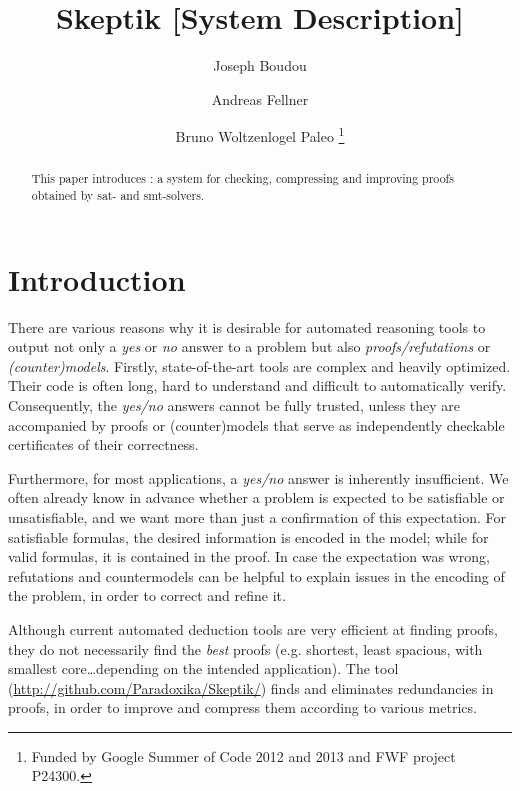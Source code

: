 \documentclass{llncs}
\title{ 
Skeptik [System Description]
}
\author{
  Joseph Boudou\inst{1}
  \and 
  Andreas Fellner\inst{2,3}
  \and 
  Bruno Woltzenlogel Paleo\inst{3}
  \thanks{Funded by Google Summer of Code 2012 and 2013 and FWF project P24300.}
}
\institute{
  IRIT, Universit\'e de Toulouse, France \\
  \email{joseph.boudou@irit.fr}
  \and 
  Free University of Bolzano, Italy \\
  \email{fellner.a@gmail.com}
  \and 
  Vienna University of Technology, Austria \\
  \email{bruno@logic.at}
}
\begin{document}
\maketitle


\begin{abstract}
This paper introduces \skeptik: a system for checking, compressing and improving proofs obtained by sat- and smt-solvers.
\end{abstract}

\setcounter{footnote}{0}


\section{Introduction}

There are various reasons why it is desirable 
for automated reasoning
tools to output not only a \emph{yes} or \emph{no} answer to a problem 
but also \emph{proofs/refutations} or \emph{(counter)models}. 
%
Firstly, state-of-the-art tools are complex and heavily optimized. Their code is often long, hard to understand and difficult to automatically verify. Consequently, the \emph{yes/no} answers cannot be fully trusted, unless they are accompanied by proofs or (counter)models that serve as independently checkable certificates of 
their correctness. 

Furthermore, for most applications, a \emph{yes/no} answer is inherently insufficient. We often already know in advance whether a problem is expected to be satisfiable or unsatisfiable, and we want more than just a confirmation of this expectation. For satisfiable formulas, the desired information is encoded in the model; while for valid formulas, it is contained in the proof. In case the expectation was wrong, refutations and countermodels can be helpful to explain issues in the encoding of the problem, in order to correct and refine it. 

Although current automated deduction tools are very efficient at finding proofs, they do not necessarily find the \emph{best} proofs (e.g. shortest, least spacious, with smallest core\ldots depending on the intended application). The {\skeptik} tool (\url{http://github.com/Paradoxika/Skeptik/}) finds and eliminates redundancies in proofs, in order to improve and compress them according to various metrics.
\end{document}
